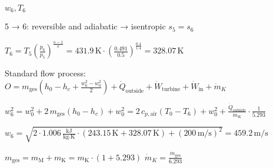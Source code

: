 \( w_6, T_6 \)  

5 → 6: reversible and adiabatic → isentropic  
\( s_5 = s_6 \)  

\( T_6 = T_5 \left( \frac{p_6}{p_5} \right)^{\frac{\kappa - 1}{\kappa}} = 431.9 \, \text{K} \cdot \left( \frac{0.491}{0.5} \right)^{\frac{0.4}{1.4}} = 328.07 \, \text{K} \)  

Standard flow process:  
\( O = m_{\text{ges}} \left( h_0 - h_c + \frac{w_6^2 - w_0^2}{2} \right) + \dot{Q}_{\text{outside}} + \dot{W}_{\text{turbine}} + \dot{W}_{\text{in}} + \dot{m}_K \)  

\( w_6^2 = w_0^2 + 2 \, m_{\text{ges}} \left( h_0 - h_c \right) + w_0^2 = 2 \, c_{p,\text{air}} \left( T_0 - T_6 \right) + w_0^2 + \frac{\dot{Q}_{\text{outside}}}{\dot{m}_K} \cdot \frac{1}{5.293} \)  

\( w_6 = \sqrt{2 \cdot 1.006 \, \frac{\text{kJ}}{\text{kg·K}} \cdot (243.15 \, \text{K} + 328.07 \, \text{K}) + (200 \, \text{m/s})^2} = 459.2 \, \text{m/s} \)  

\( m_{\text{ges}} = m_{\text{M}} + m_{\text{K}} = m_{\text{K}} \cdot (1 + 5.293) \)  
\( \dot{m}_K = \frac{\dot{m}_{\text{ges}}}{6.293} \)